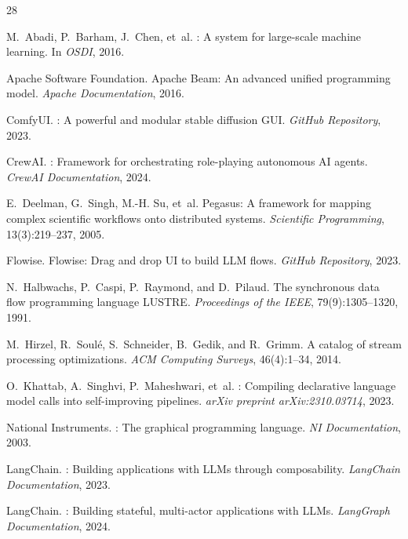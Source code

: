 
\begin{thebibliography}{28}

M.~Abadi, P.~Barham, J.~Chen, et~al.
: A system for large-scale machine learning.
\newblock In \emph{OSDI}, 2016.

Apache Software Foundation.
\newblock Apache {Beam}: An advanced unified programming model.
\newblock \emph{Apache Documentation}, 2016.

ComfyUI.
: A powerful and modular stable diffusion {GUI}.
\newblock \emph{GitHub Repository}, 2023.

CrewAI.
: Framework for orchestrating role-playing autonomous {AI} agents.
\newblock \emph{CrewAI Documentation}, 2024.

E.~Deelman, G.~Singh, M.-H. Su, et~al.
\newblock Pegasus: A framework for mapping complex scientific workflows onto distributed systems.
\newblock \emph{Scientific Programming}, 13(3):219--237, 2005.

Flowise.
\newblock Flowise: Drag and drop {UI} to build {LLM} flows.
\newblock \emph{GitHub Repository}, 2023.

N.~Halbwachs, P.~Caspi, P.~Raymond, and D.~Pilaud.
\newblock The synchronous data flow programming language {LUSTRE}.
\newblock \emph{Proceedings of the IEEE}, 79(9):1305--1320, 1991.

M.~Hirzel, R.~Soul\'e, S.~Schneider, B.~Gedik, and R.~Grimm.
\newblock A catalog of stream processing optimizations.
\newblock \emph{ACM Computing Surveys}, 46(4):1--34, 2014.

O.~Khattab, A.~Singhvi, P.~Maheshwari, et~al.
: Compiling declarative language model calls into self-improving pipelines.
\newblock \emph{arXiv preprint arXiv:2310.03714}, 2023.

National Instruments.
: The graphical programming language.
\newblock \emph{NI Documentation}, 2003.

LangChain.
: Building applications with {LLM}s through composability.
\newblock \emph{LangChain Documentation}, 2023.

LangChain.
: Building stateful, multi-actor applications with {LLM}s.
\newblock \emph{LangGraph Documentation}, 2024.


\end{thebibliography}

